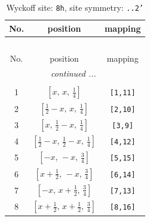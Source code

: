 \documentclass[fleqn,8pt]{jsarticle}
\begin{document}
\begin{longtable}{ccc}
\caption{Wyckoff site: {\tt 8h}, site symmetry: {\tt ..2'}}
 \\
 \hline \hline
No. & position & mapping \\ \hline \endfirsthead

\multicolumn{2}{l}{\tablename\ \thetable{}} \\
 \hline \hline
No. & position & mapping \\ \hline \endhead

 \hline \hline
\multicolumn{2}{r}{\footnotesize\it continued ...} \\ \endfoot

 \hline \hline
\multicolumn{2}{r}{} \\ \endlastfoot

1 & $\left[ x,\, x,\, \frac{1}{4} \right]$ & {\tt [1,11]} \\ \hline
2 & $\left[ \frac{1}{2} - x,\, x,\, \frac{1}{4} \right]$ & {\tt [2,10]} \\ \hline
3 & $\left[ x,\, \frac{1}{2} - x,\, \frac{1}{4} \right]$ & {\tt [3,9]} \\ \hline
4 & $\left[ \frac{1}{2} - x,\, \frac{1}{2} - x,\, \frac{1}{4} \right]$ & {\tt [4,12]} \\ \hline
5 & $\left[ - x,\, - x,\, \frac{3}{4} \right]$ & {\tt [5,15]} \\ \hline
6 & $\left[ x + \frac{1}{2},\, - x,\, \frac{3}{4} \right]$ & {\tt [6,14]} \\ \hline
7 & $\left[ - x,\, x + \frac{1}{2},\, \frac{3}{4} \right]$ & {\tt [7,13]} \\ \hline
8 & $\left[ x + \frac{1}{2},\, x + \frac{1}{2},\, \frac{3}{4} \right]$ & {\tt [8,16]} \\
\end{longtable}
\renewcommand{\arraystretch}{1.2}
\end{document}
